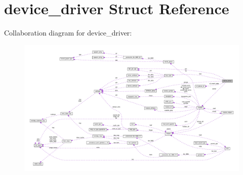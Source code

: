 \hypertarget{structdevice__driver}{}\section{device\+\_\+driver Struct Reference}
\label{structdevice__driver}


Collaboration diagram for device\+\_\+driver\+:
\nopagebreak
\begin{figure}[H]
\begin{center}
\leavevmode
\includegraphics[width=350pt]{structdevice__driver__coll__graph}
\end{center}
\end{figure}
